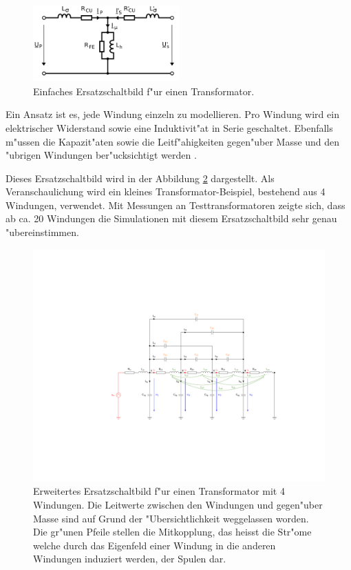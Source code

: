 \begin{refsection}
\begin{figure}
	\centering
	\includegraphics[width=0.5\textwidth]{./trafo/images/Einfaches_ESB.png}
	\caption[Einfaches Ersatzschaltbild f"ur einen Transformator]{Einfaches Ersatzschaltbild f"ur einen Transformator.}
	\label{trafo:einfaches_ESB}
\end{figure}

Ein Ansatz ist es, jede Windung einzeln zu modellieren. Pro Windung wird ein elektrischer Widerstand sowie eine Induktivit"at in Serie geschaltet. Ebenfalls m"ussen die Kapazit"aten sowie die Leitf"ahigkeiten gegen"uber Masse und den "ubrigen Windungen ber"ucksichtigt werden \cite{trafo:BILImpulse}. 

Dieses Ersatzschaltbild wird in der Abbildung \ref{trafo:erweitertes_ESB} dargestellt. Als Veranschaulichung wird ein kleines Transformator-Beispiel, bestehend aus 4 Windungen, verwendet. Mit Messungen an Testtransformatoren zeigte sich, dass ab ca. 20 Windungen die Simulationen mit diesem Ersatzschaltbild sehr genau "ubereinstimmen. 

\begin{figure}
	\centering
	\includegraphics[width=\hsize]{./trafo/images/Trafo_Modell.pdf}
	\caption[Erweitertes Ersatzschaltbild f"ur einen Transformator]{Erweitertes Ersatzschaltbild f"ur einen Transformator mit 4 Windungen. Die Leitwerte zwischen den Windungen und gegen"uber Masse sind auf Grund der "Ubersichtlichkeit weggelassen worden. Die gr"unen Pfeile stellen die Mitkopplung, das heisst die Str"ome welche durch das Eigenfeld einer Windung in die anderen Windungen induziert werden, der Spulen dar. }
	\label{trafo:erweitertes_ESB}
\end{figure}


\end{refsection}
